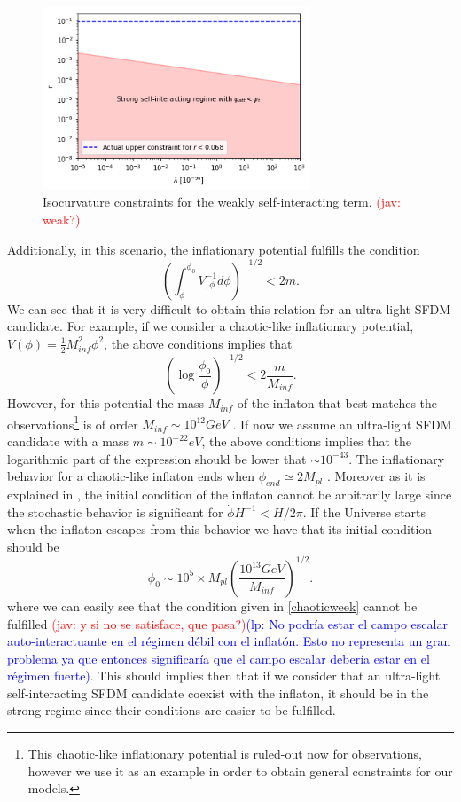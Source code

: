 \documentclass[amssymb,twocolumn,prd,nofootinbib,showpacs]{revtex4-1}
\newcommand{\jav}[1]{\textcolor{red}{(jav: #1)}}
\newcommand{\lp}[1]{\textcolor{blue}{(lp: #1)}}
\begin{document}
\begin{figure}[h!]
\includegraphics[width=8cm]{lambdavsr.png}
\caption{Isocurvature constraints for the weakly self-interacting term. \jav{weak?}}\label{constraintsSFDMl}
\end{figure} 

Additionally, in this scenario, the inflationary potential fulfills the condition 
%
\begin{equation}
\left(\int^{\phi_0}_\phi V_{,\phi}^{-1}d\phi\right)^{-1/2}<2m.
\end{equation}
%
We can see that it is very difficult to obtain this relation for an ultra-light SFDM candidate. 
For example, if we consider a chaotic-like inflationary potential, $V(\phi)=\frac{1}{2}M_{inf}^2\phi^2$, 
the above conditions implies that
%
\begin{equation}\label{chaoticweek}
\left(\log\frac{\phi_0}{\phi}\right)^{-1/2}<2\frac{m}{M_{inf}}.
\end{equation}
%
However, for this potential the mass $M_{inf}$ of the inflaton 
that best matches the observations\footnote{This chaotic-like inflationary potential is 
ruled-out now for observations, however we use it as an example in order to obtain 
general constraints for our models.} is of order $M_{inf}\sim 10^{12} GeV$ \cite{Liddle}. 
If now we assume an ultra-light SFDM candidate with a mass $m\sim 10^{-22}eV$, 
the above conditions implies that the logarithmic part of the expression should be 
lower that $\sim 10^{-43}$. The inflationary behavior for a chaotic-like inflaton ends 
when $\phi_{end}\simeq 2M_{pl}$ \cite{curvatonatractor,Liddle}. Moreover as it is 
explained in \cite{curvatonatractor}, the initial condition of the inflaton cannot be 
arbitrarily large since the stochastic behavior is significant for $\dot\phi H^{-1}<H/2\pi$. 
%
If the Universe starts when the inflaton escapes from this 
behavior we have that its initial condition should be
%
\begin{equation}\label{phi_0}
\phi_0\sim 10^5\times M_{pl}\left(\frac{10^{13}GeV}{M_{inf}}\right)^{1/2}.
\end{equation}
%
where we can easily see that the condition given in \eqref{chaoticweek} cannot be fulfilled 
\jav{y si no se satisface, que pasa?}\lp{No podr\'ia estar el campo escalar auto-interactuante en
el r\'egimen d\'ebil con el inflat\'on.  Esto no representa un
gran problema ya que entonces significar\'ia que el campo
escalar deber\'ia estar en el r\'egimen fuerte}. This should implies then that if we consider that an ultra-light self-interacting SFDM candidate coexist with the inflaton, it should be in the strong regime since their conditions are easier to be fulfilled.
\end{document}
